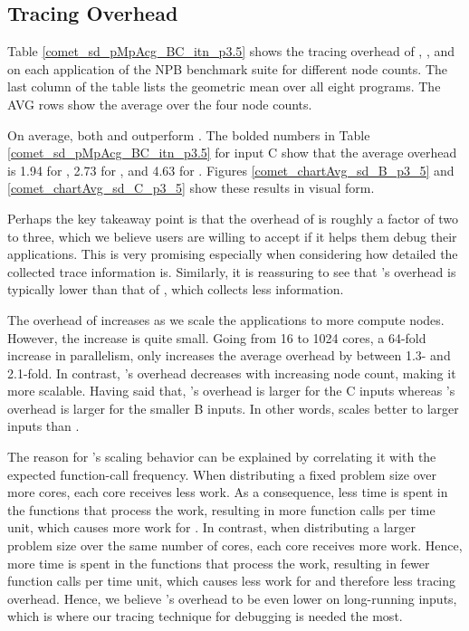 

\subsection{Tracing Overhead}
\label{subsec:lowtoh}



Table \ref{comet_sd_pMpAcg_BC_itn_p3.5} shows the tracing overhead of \parlotm, \parlota, and \callgrind on each application of the NPB benchmark suite for different node counts. The last column of the table lists the geometric mean over all eight programs. The AVG rows show the average over the four node counts.

On average, both \parlotm and \parlota outperform \callgrind. The bolded numbers in Table \ref{comet_sd_pMpAcg_BC_itn_p3.5} for input C show that the average overhead is 1.94 for \parlotm, 2.73 for \parlota, and 4.63 for \callgrind. Figures \ref{comet_chartAvg_sd_B_p3_5} and \ref{comet_chartAvg_sd_C_p3_5} show these results in visual form.

Perhaps the key takeaway point is that the overhead of \parlot is roughly a factor of two to three, which we believe users are willing to accept if it helps them debug their applications. This is very promising especially when considering how detailed the collected trace information is. Similarly, it is reassuring to see that \parlot 's overhead is typically lower than that of \callgrind, which collects less information.

The overhead of \parlot increases as we scale the applications to more compute nodes. However, the increase is quite small. Going from 16 to 1024 cores, a 64-fold increase in parallelism, only increases the average overhead by between 1.3- and 2.1-fold. In contrast, \callgrind 's overhead decreases with increasing node count, making it more scalable. Having said that, \callgrind 's overhead is larger for the C inputs whereas \parlot 's overhead is larger for the smaller B inputs. In other words, \parlot scales better to larger inputs than \callgrind.

The reason for \parlot 's scaling behavior can be explained by correlating it with the expected function-call frequency. When distributing a fixed problem size over more cores, each core receives less work. As a consequence, less time is spent in the functions that process the work, resulting in more function calls per time unit, which causes more work for \parlot. In contrast, when distributing a larger problem size over the same number of cores, each core receives more work. Hence, more time is spent in the functions that process the work, resulting in fewer function calls per time unit, which causes less work for \parlot and therefore less tracing overhead. Hence, we believe \parlot 's overhead to be even lower on long-running inputs, which is where our tracing technique for debugging is needed the most.

